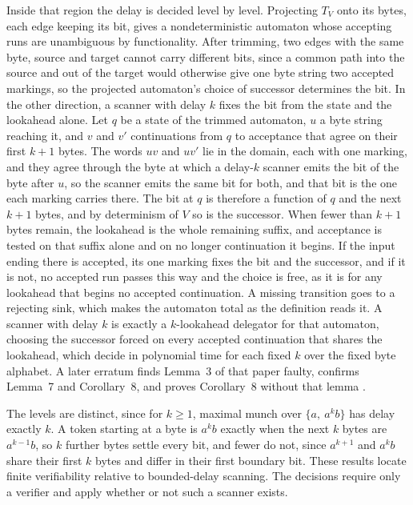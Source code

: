 \documentclass[11pt,a4paper]{article}
\theoremstyle{definition}
\theoremstyle{plain}
\begin{document}
Inside that region the delay is decided level by level. Projecting $T_V$ onto its bytes, each edge keeping its bit,
gives a nondeterministic automaton whose accepting runs are unambiguous by functionality. After trimming, two edges with
the same byte, source and target cannot carry different bits, since a common path into the source and out of the target
would otherwise give one byte string two accepted markings, so the projected automaton's choice of successor determines
the bit. In the other direction, a scanner with delay $k$ fixes the bit from the state and the lookahead alone. Let $q$
be a state of the trimmed automaton, $u$ a byte string reaching it, and $v$ and $v'$ continuations from $q$ to
acceptance that agree on their first $k + 1$ bytes. The words $uv$ and $uv'$ lie in the domain, each with one marking,
and they agree through the byte at which a delay-$k$ scanner emits the bit of the byte after $u$, so the scanner emits
the same bit for both, and that bit is the one each marking carries there. The bit at $q$ is therefore a function of $q$
and the next $k + 1$ bytes, and by determinism of $V$ so is the successor. When fewer than $k + 1$ bytes remain, the
lookahead is the whole remaining suffix, and acceptance is tested on that suffix alone and on no longer continuation it
begins. If the input ending there is accepted, its one marking fixes the bit and the successor, and if it is not, no
accepted run passes this way and the choice is free, as it is for any lookahead that begins no accepted continuation. A
missing transition goes to a rejecting sink, which makes the automaton total as the definition reads it. A scanner with
delay $k$ is exactly a $k$-lookahead delegator for that automaton, choosing the successor forced on every accepted
continuation that shares the lookahead, which \citet[Corollary~8]{loding2013delegators} decide in polynomial time for
each fixed $k$ over the fixed byte alphabet. A later erratum finds Lemma~3 of that paper faulty, confirms Lemma~7 and
Corollary~8, and proves Corollary~8 without that lemma \citep{loding2023errata}.

The levels are distinct, since for $k \ge 1$, maximal munch over $\{a,\ a^{k}b\}$ has delay exactly $k$. A token
starting at a byte is $a^{k}b$ exactly when the next $k$ bytes are $a^{k-1}b$, so $k$ further bytes settle every bit,
and fewer do not, since $a^{k+1}$ and $a^{k}b$ share their first $k$ bytes and differ in their first boundary bit. These
results locate finite verifiability relative to bounded-delay scanning. The decisions require only a verifier and apply
whether or not such a scanner exists.
\end{document}
